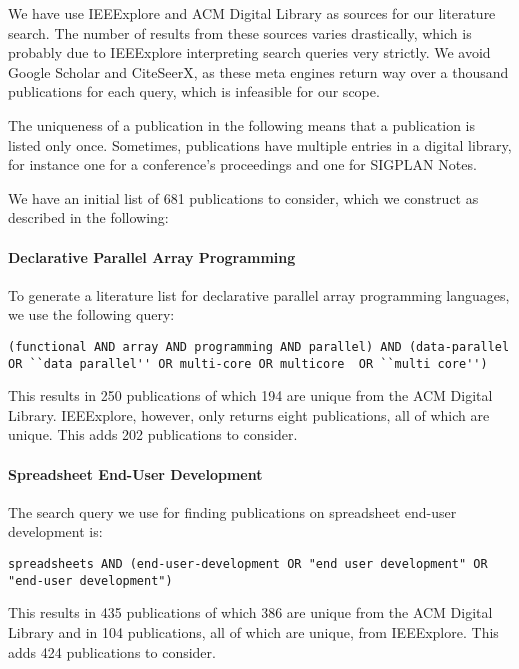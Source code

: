 \documentclass[a4paper]{article}
\begin{document}
We have use IEEExplore and ACM Digital Library as sources for our literature search. The number of results from these sources varies drastically, which is probably due to IEEExplore interpreting search queries very strictly. We avoid Google Scholar and CiteSeerX, as these meta engines return way over a thousand publications for each query,
which is infeasible for our scope.

The uniqueness of a publication in the following means that a publication is listed only once. Sometimes, publications have multiple entries in a digital library, for instance one for a conference's proceedings and one for SIGPLAN Notes.

We have an initial list of 681 publications to consider, which we construct as described in the following:

\paragraph{Declarative Parallel Array Programming}

To generate a literature list for declarative parallel array programming languages, we use the following query:

\begin{lstlisting}
(functional AND array AND programming AND parallel) AND (data-parallel OR ``data parallel'' OR multi-core OR multicore  OR ``multi core'')
\end{lstlisting}

\noindent This results in 250 publications of which 194 are unique from the ACM Digital Library. IEEExplore, however, only returns eight publications,
all of which are unique. This adds 202 publications to consider.

\paragraph{Spreadsheet End-User Development}

The search query we use for finding publications on spreadsheet end-user development is:

\begin{lstlisting}
spreadsheets AND (end-user-development OR "end user development" OR "end-user development")
\end{lstlisting}

\noindent This results in 435 publications of which 386 are unique from the ACM Digital Library and in 104 publications, all of which are unique, from IEEExplore. This adds 424 publications to consider.
\end{document}
